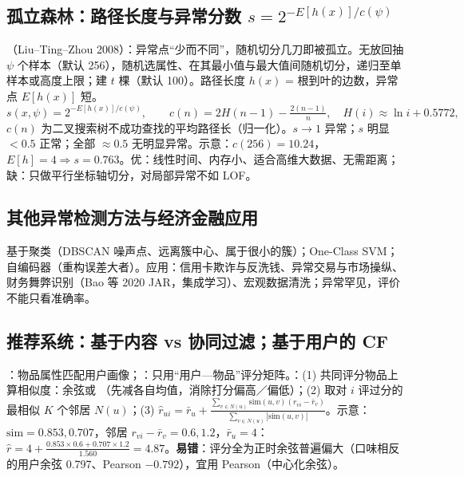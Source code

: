 \subsection{孤立森林：路径长度与异常分数 \texorpdfstring{$s=2^{-E[h(x)]/c(\psi)}$}{s = 2^(-E[h]/c(psi))}}
（Liu–Ting–Zhou 2008）：异常点“少而不同”，随机切分几刀即被孤立。无放回抽 $\psi$ 个样本（默认 256），随机选属性、在其最小值与最大值间随机切分，递归至单样本或高度上限；建 $t$ 棵（默认 100）。路径长度 $h(x)$ = 根到叶的边数，异常点 $E[h(x)]$ 短。
\[s(x,\psi)=2^{-E[h(x)]/c(\psi)},\qquad c(n)=2H(n-1)-\tfrac{2(n-1)}n,\quad H(i)\approx\ln i+0.5772,\]
$c(n)$ 为二叉搜索树不成功查找的平均路径长（归一化）。$s\to1$ 异常；$s$ 明显 $<0.5$ 正常；全部 $\approx0.5$ 无明显异常。示意：$c(256)=10.24$，$E[h]=4\Rightarrow s=0.763$。优：线性时间、内存小、适合高维大数据、无需距离；缺：只做平行坐标轴切分，对局部异常不如 LOF。

\subsection{其他异常检测方法与经济金融应用}
基于聚类（DBSCAN 噪声点、远离簇中心、属于很小的簇）；One-Class SVM；自编码器（重构误差大者）。应用：信用卡欺诈与反洗钱、异常交易与市场操纵、财务舞弊识别（Bao 等 2020 JAR，集成学习）、宏观数据清洗；异常罕见，评价不能只看准确率。

\subsection{推荐系统：基于内容 vs 协同过滤；基于用户的 CF}
：物品属性匹配用户画像；：只用“用户—物品”评分矩阵。：(1) 共同评分物品上算相似度：余弦或 （先减各自均值，消除打分偏高／偏低）；(2) 取对 $i$ 评过分的最相似 $K$ 个邻居 $N(u)$；(3) $\hat r_{ui}=\bar r_u+\frac{\sum_{v\in N(u)}\mathrm{sim}(u,v)(r_{vi}-\bar r_v)}{\sum_{v\in N(u)}|\mathrm{sim}(u,v)|}$。示意：$\mathrm{sim}=0.853,0.707$，邻居 $r_{vi}-\bar r_v=0.6,1.2$，$\bar r_u=4$：$\hat r=4+\frac{0.853\times0.6+0.707\times1.2}{1.560}=4.87$。\textbf{易错}：评分全为正时余弦普遍偏大（口味相反的用户余弦 0.797、Pearson $-0.792$），宜用 Pearson（中心化余弦）。

